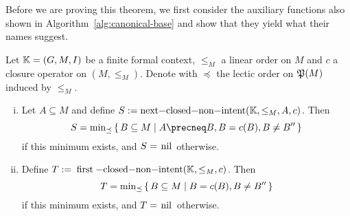 Before we are proving this theorem, we first consider the auxiliary functions also shown
in Algorithm~\ref{alg:canonical-base} and show that they yield what their names suggest.

\begin{Proposition}
  \label{prop:auxiliary-functions-canonical-base}
  Let ${\mathbb{K}} = (G, M, I)$ be a finite formal context, $\leq_M$ a linear order on $M$ and
  $c$ a closure operator on $(M, \leq_M)$.  Denote with $\preceq$ the lectic order on
  ${\mathfrak{P}(M)}$ induced by $\leq_M$.
  \begin{enumerate}[i. ]
  \item Let $A \subseteq M$ and define $S :=
    \text{\lstinline{next-closed-non-intent}}(\con K, \leq_M, A, c)$.  Then
    \begin{equation*}
      S = \min\nolimits_{\preceq} \set{ B \subseteq M \mid A \precneq B, B = c(B), B \neq
        B''}
    \end{equation*}
    if this minimum exists, and $S = \text{\lstinline{nil}}$ otherwise.
  \item Define $T := \text{\lstinline{first-closed-non-intent}}(\con K, \leq_M, c)$.  Then
    \begin{equation*}
      T = \min\nolimits_{\preceq}{\{\, B \subseteq M \mid B = c(B), B \neq B'' \,\}}
    \end{equation*}
    if this minimum exists, and $T = \text{\lstinline{nil}}$ otherwise.
  \end{enumerate}
\end{Proposition}
